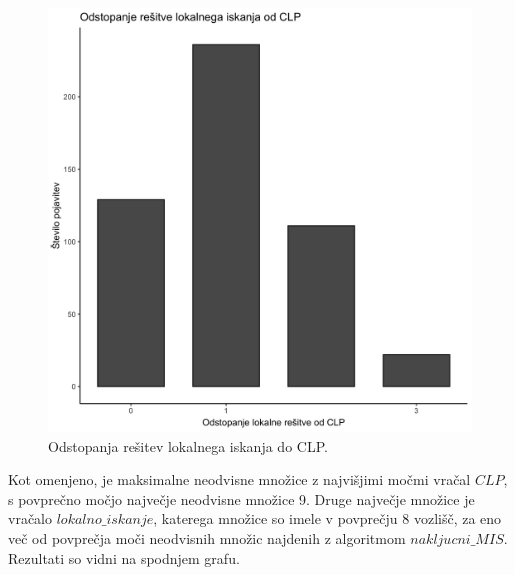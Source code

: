 \documentclass[a4paper, 12pt]{article}
\begin{document}
\begin{figure}[h!]
	\begin{center}
		\includegraphics[scale=0.10]{R_koda/pon-napake.png}
		\caption{Odstopanja rešitev lokalnega iskanja do CLP.}
	\end{center}
\end{figure}

\newpage
\noindent Kot omenjeno, je maksimalne neodvisne množice z najvišjimi močmi vračal $CLP$, s povprečno močjo največje neodvisne množice 9. Druge največje množice je vračalo $lokalno\_iskanje$,
katerega množice so imele v povprečju 8 vozlišč, za eno več od povprečja moči neodvisnih množic najdenih z algoritmom $nakljucni\_MIS$. Rezultati so vidni na spodnjem grafu.
\end{document}
